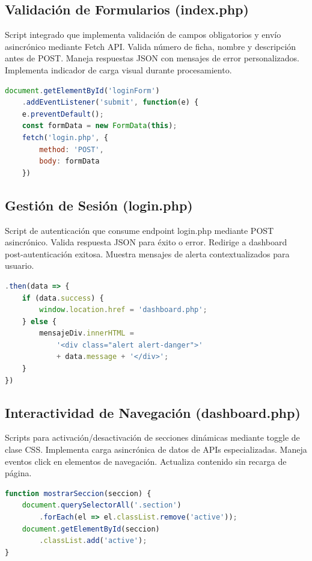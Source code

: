 \documentclass[12pt,a4paper]{article}
\begin{document}
\subsection{Validación de Formularios (index.php)}

Script integrado que implementa validación de campos obligatorios y envío asincrónico mediante Fetch API. Valida número de ficha, nombre y descripción antes de POST. Maneja respuestas JSON con mensajes de error personalizados. Implementa indicador de carga visual durante procesamiento.

\begin{lstlisting}[language=JavaScript,caption={Validación form}]
document.getElementById('loginForm')
    .addEventListener('submit', function(e) {
    e.preventDefault();
    const formData = new FormData(this);
    fetch('login.php', {
        method: 'POST',
        body: formData
    })
\end{lstlisting}

\subsection{Gestión de Sesión (login.php)}

Script de autenticación que consume endpoint login.php mediante POST asincrónico. Valida respuesta JSON para éxito o error. Redirige a dashboard post-autenticación exitosa. Muestra mensajes de alerta contextualizados para usuario.

\begin{lstlisting}[language=JavaScript,caption={Lógica login}]
.then(data => {
    if (data.success) {
        window.location.href = 'dashboard.php';
    } else {
        mensajeDiv.innerHTML = 
            '<div class="alert alert-danger">' 
            + data.message + '</div>';
    }
})
\end{lstlisting}

\subsection{Interactividad de Navegación (dashboard.php)}

Scripts para activación/desactivación de secciones dinámicas mediante toggle de clase CSS. Implementa carga asincrónica de datos de APIs especializadas. Maneja eventos click en elementos de navegación. Actualiza contenido sin recarga de página.

\begin{lstlisting}[language=JavaScript,caption={Toggle secciones}]
function mostrarSeccion(seccion) {
    document.querySelectorAll('.section')
        .forEach(el => el.classList.remove('active'));
    document.getElementById(seccion)
        .classList.add('active');
}
\end{lstlisting}
\end{document}
